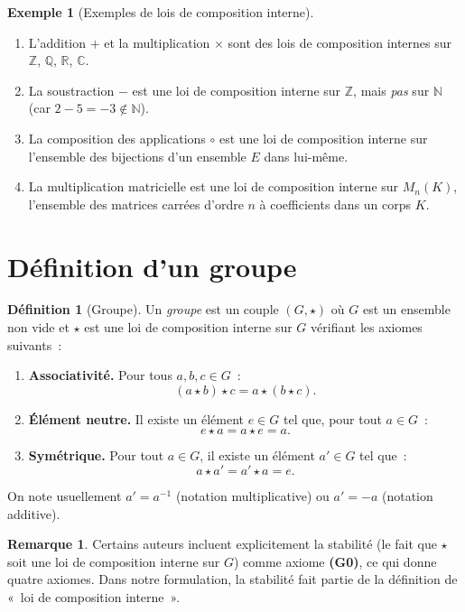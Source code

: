 \documentclass[12pt,a4paper,openany]{book}
\theoremstyle{definition}
\newtheorem{definition}{Définition}[chapter]
\newtheorem{remarque}{Remarque}[chapter]
\newtheorem{exemple}{Exemple}[chapter]
\newcommand{\N}{\mathbb{N}}
\newcommand{\Z}{\mathbb{Z}}
\newcommand{\Q}{\mathbb{Q}}
\newcommand{\R}{\mathbb{R}}
\newcommand{\C}{\mathbb{C}}
\begin{document}
\begin{exemple}[Exemples de lois de composition interne]
\label{ex:lci-exemples}
\begin{enumerate}[label=(\roman*)]
  \item L'addition $+$ et la multiplication $\times$ sont des lois de composition
    internes sur $\Z$, $\Q$, $\R$, $\C$.
  \item La soustraction $-$ est une loi de composition interne sur $\Z$, mais
    \emph{pas} sur $\N$ (car $2 - 5 = -3 \notin \N$).
  \item La composition des applications $\circ$ est une loi de composition interne sur
    l'ensemble des bijections d'un ensemble $E$ dans lui-même.
  \item La multiplication matricielle est une loi de composition interne sur $M_n(K)$,
    l'ensemble des matrices carrées d'ordre $n$ à coefficients dans un corps $K$.
\end{enumerate}
\end{exemple}

\section{Définition d'un groupe}
\label{sec:ch1-def-groupe}

\begin{definition}[Groupe]
\label{def:groupe}
Un \emph{groupe} est un couple $(G, \star)$ où $G$ est un ensemble non vide et $\star$
est une loi de composition interne sur $G$ vérifiant les axiomes suivants~:
\begin{enumerate}[label=\textbf{(G\arabic*)}]
  \item \textbf{Associativité.} Pour tous $a, b, c \in G$~:
    \[
      (a \star b) \star c = a \star (b \star c).
    \]
  \item \textbf{Élément neutre.} Il existe un élément $e \in G$
    tel que, pour tout $a \in G$~:
    \[
      e \star a = a \star e = a.
    \]
  \item \textbf{Symétrique.} Pour tout $a \in G$, il
    existe un élément $a' \in G$ tel que~:
    \[
      a \star a' = a' \star a = e.
    \]
\end{enumerate}
On note usuellement $a' = a^{-1}$ (notation multiplicative) ou $a' = -a$ (notation
additive).
\end{definition}

\begin{remarque}
\label{rem:quatre-axiomes}
Certains auteurs incluent explicitement la stabilité (le fait que $\star$ soit une loi de
composition interne sur $G$) comme axiome \textbf{(G0)}, ce qui donne quatre axiomes.
Dans notre formulation, la stabilité fait partie de la définition de «~loi de composition
interne~».
\end{remarque}
\end{document}
